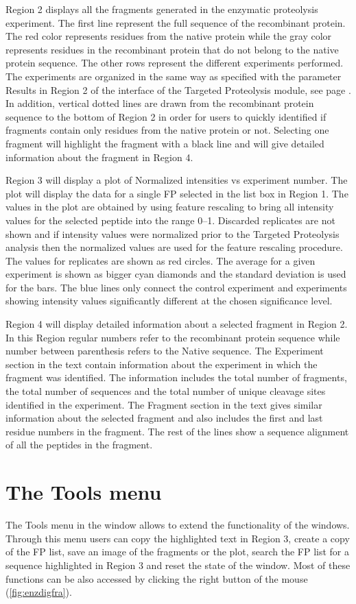 Region \num{2} displays all the fragments generated in the enzymatic proteolysis experiment. The first line represent the full sequence of the recombinant protein. The red color represents residues from the native protein while the gray color represents residues in the recombinant protein that do not belong to the native protein sequence. The other rows represent the different experiments performed. The experiments are organized in the same way as specified with the parameter Results in Region \num{2} of the interface of the Targeted Proteolysis module, see page \pageref{par:results}. In addition, vertical dotted lines are drawn from the recombinant protein sequence to the bottom of Region \num{2} in order for users to quickly identified if fragments contain only residues from the native protein or not. Selecting one fragment will highlight the fragment with a black line and will give detailed information about the fragment in Region \num{4}. 

Region \num{3} will display a plot of Normalized intensities vs experiment number. The plot will display the data for a single FP selected in the list box in Region \num{1}. The values in the plot are obtained by using feature rescaling to bring all intensity values for the selected peptide into the range \numrange{0}{1}. Discarded replicates are not shown and if intensity values were normalized prior to the Targeted Proteolysis analysis then the normalized values are used for the feature rescaling procedure. The values for replicates are shown as red circles. The average for a given experiment is shown as bigger cyan diamonds and the standard deviation is used for the bars. The blue lines only connect the control experiment and experiments showing intensity values significantly different at the chosen significance level.  

Region \num{4} will display detailed information about a selected fragment in Region \num{2}. In this Region regular numbers refer to the recombinant protein sequence while number between parenthesis refers to the Native sequence. The Experiment section in the text contain information about the experiment in which the fragment was identified. The information includes the total number of fragments, the total number of sequences and the total number of unique cleavage sites identified in the experiment. The Fragment section in the text gives similar information about the selected fragment and also includes the first and last residue numbers in the fragment. The rest of the lines show a sequence alignment of all the peptides in the fragment.

\section{The Tools menu}

The Tools menu in the window allows to extend the functionality of the windows. Through this menu users can copy the highlighted text in Region \num{3}, create a copy of the FP list, save an image of the fragments or the plot, search the FP list for a sequence highlighted in Region \num{3} and reset the state of the window. Most of these functions can be also accessed by clicking the right button of the mouse (\autoref{fig:enzdigfra}).  